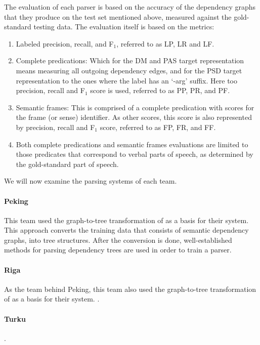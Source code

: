 The evaluation of each parser is based on the accuracy of the dependency graphs that they produce on the test set mentioned above, measured against the gold-standard testing data. The evaluation itself is based on the metrics: 

\begin{enumerate}
    \item Labeled precision, recall, and F$_1$, referred to as LP, LR and LF.
    \item Complete predications: Which for the DM and PAS target representation means measuring all outgoing dependency edges, and for the PSD target representation to the ones where the label has an `-arg' suffix. Here too precision, recall and F$_1$ score is used, referred to as PP, PR, and PF.
    \item Semantic frames: This is comprised of a complete predication with scores for the frame (or sense) identifier. As other scores, this score is also represented by precision, recall and F$_1$ score, referred to as FP, FR, and FF.
    \item Both complete predications and semantic frames evaluations are limited to those predicates that correspond to verbal parts of speech, as determined by the gold-standard part of speech.
\end{enumerate}

We will now examine the parsing systems of each team.

\paragraph{Peking} This team used the graph-to-tree transformation of  as a basis for their system. This approach converts the training data that consists of semantic dependency graphs, into tree structures. After the conversion is done, well-established methods for parsing dependency trees are used in order to train a parser. 

\paragraph{Riga} As the team behind Peking, this team also used the graph-to-tree transformation of  as a basis for their system. \cite{Barzdins:Riga:15}.

\paragraph{Turku} \cite{Kanerva:Turku:14} \cite{Kanerva:Turku:15}.

